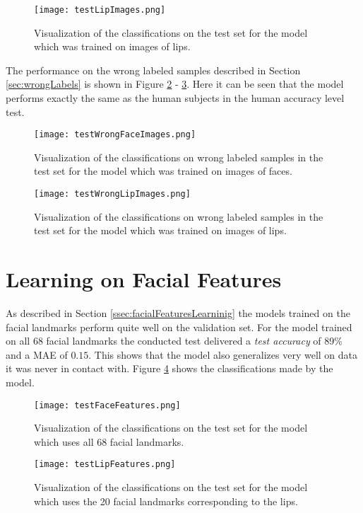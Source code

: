 \begin{figure}
  \centering
  \texttt{[image: testLipImages.png]}
  \caption{Visualization of the classifications on the test set for the model which was trained on images of lips.}
  \label{fig:testLipImages}
\end{figure}

The performance on the wrong labeled samples described in Section \ref{sec:wrongLabels} is shown in Figure \ref{fig:testWrongFaceImages} - \ref{fig:testWrongLipImages}.
Here it can be seen that the model performs exactly the same as the human subjects in the human accuracy level test.

\begin{figure}
  \centering
  \texttt{[image: testWrongFaceImages.png]}
  \caption{Visualization of the classifications on wrong labeled samples in the test set for the model which was trained on images of faces.}
  \label{fig:testWrongFaceImages}
\end{figure}

\begin{figure}
  \centering
  \texttt{[image: testWrongLipImages.png]}
  \caption{Visualization of the classifications on wrong labeled samples in the test set for the model which was trained on images of lips.}
  \label{fig:testWrongLipImages}
\end{figure}


\section{Learning on Facial Features}
As described in Section \ref{ssec:facialFeaturesLearninig} the models trained on the facial landmarks perform quite well on the validation set.
For the model trained on all 68 facial landmarks the conducted test delivered a \emph{test accuracy} of 89\%
and a MAE of $0.15$. 
This shows that the model also generalizes very well on data it was never in contact with.
Figure \ref{fig:testFaceFeatures} shows the classifications made by the model.


\begin{figure}
  \centering
  \texttt{[image: testFaceFeatures.png]}
  \caption{Visualization of the classifications on the test set for the model which uses all 68 facial landmarks.}
  \label{fig:testFaceFeatures}
\end{figure}

\begin{figure}
  \centering
  \texttt{[image: testLipFeatures.png]}
  \caption{Visualization of the classifications on the test set for the model which uses the 20 facial landmarks corresponding to the lips.}
  \label{fig:testLipFeatures}
\end{figure}

